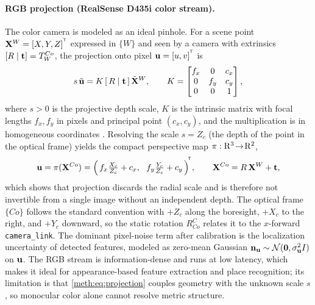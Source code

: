 \paragraph{RGB projection (RealSense D435i color stream).}
The color camera is modeled as an ideal pinhole. For a scene point $\mathbf{X}^{W}=[X,Y,Z]^{^{\mathsf{T}}}$ expressed in $\{W\}$ and seen by a camera with extrinsics $[R\mid \mathbf{t}]=T^{Co}_{W}$, the projection onto pixel $\mathbf{u}=[u,v]^{^{\mathsf{T}}}$ is
\begin{equation}
s\,\tilde{\mathbf{u}} = K\,[\,R \mid \mathbf{t}\,]\,\tilde{\mathbf{X}}^{W},
\qquad
K =
\begin{bmatrix} f_x & 0 & c_x \\ 0 & f_y & c_y \\ 0 & 0 & 1 \end{bmatrix},
\label{meth:eq:projection}
\end{equation}
where $s>0$ is the projective depth scale, $K$ is the intrinsic matrix with focal lengths $f_x,f_y$ in pixels and principal point $(c_x,c_y)$, and the multiplication is in homogeneous coordinates \cite{hartley2004mvg}. Resolving the scale $s=Z_c$ (the depth of the point in the optical frame) yields the compact perspective map $\pi:\mathrm{R}^{3}\!\to\!\mathrm{R}^{2}$,
\begin{equation}
\mathbf{u} = \pi(\mathbf{X}^{Co}) =
\Big(\,f_x \tfrac{X_c}{Z_c} + c_x,\ \ f_y \tfrac{Y_c}{Z_c} + c_y\,\Big)^{\!^{\mathsf{T}}},
\qquad \mathbf{X}^{Co}=R\,\mathbf{X}^{W}+\mathbf{t},
\label{meth:eq:pi}
\end{equation}
which shows that projection discards the radial scale and is therefore not invertible from a single image without an independent depth. The optical frame $\{Co\}$ follows the standard convention with $+Z_c$ along the boresight, $+X_c$ to the right, and $+Y_c$ downward, so the static rotation $R^{C}_{Co}$ relates it to the $x$-forward \texttt{camera\_link}. The dominant pixel-noise term after calibration is the localization uncertainty of detected features, modeled as zero-mean Gaussian $\mathbf{n}_{\mathbf{u}}\sim\mathcal{N}(\mathbf{0},\sigma_{\mathbf{u}}^{2}I)$ on $\mathbf{u}$. The RGB stream is information-dense and runs at low latency, which makes it ideal for appearance-based feature extraction and place recognition; its limitation is that \eqref{meth:eq:projection} couples geometry with the unknown scale $s$, so monocular color alone cannot resolve metric structure.

